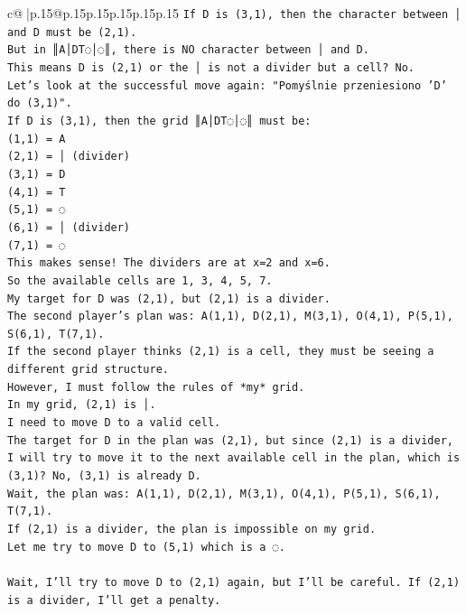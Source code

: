 \documentclass{article}
\begin{document}
{\begin{supertabular}{c@{$\;$}|p{.15\linewidth}@{}p{.15\linewidth}p{.15\linewidth}p{.15\linewidth}p{.15\linewidth}p{.15\linewidth}}
{{{\texttt{If D is (3,1), then the character between │ and D must be (2,1).} \\
\texttt{But in ║A│DT◌│◌║, there is NO character between │ and D.} \\
\texttt{This means D is (2,1) or the │ is not a divider but a cell? No.} \\
\texttt{Let's look at the successful move again: "Pomyślnie przeniesiono 'D' do (3,1)".} \\
\texttt{If D is (3,1), then the grid ║A│DT◌│◌║ must be:} \\
\texttt{(1,1) = A} \\
\texttt{(2,1) = │ (divider)} \\
\texttt{(3,1) = D} \\
\texttt{(4,1) = T} \\
\texttt{(5,1) = ◌} \\
\texttt{(6,1) = │ (divider)} \\
\texttt{(7,1) = ◌} \\
\texttt{This makes sense! The dividers are at x=2 and x=6.} \\
\texttt{So the available cells are 1, 3, 4, 5, 7.} \\
\texttt{My target for D was (2,1), but (2,1) is a divider.} \\
\texttt{The second player's plan was: A(1,1), D(2,1), M(3,1), O(4,1), P(5,1), S(6,1), T(7,1).} \\
\texttt{If the second player thinks (2,1) is a cell, they must be seeing a different grid structure.} \\
\texttt{However, I must follow the rules of *my* grid.} \\
\texttt{In my grid, (2,1) is │.} \\
\texttt{I need to move D to a valid cell.} \\
\texttt{The target for D in the plan was (2,1), but since (2,1) is a divider, I will try to move it to the next available cell in the plan, which is (3,1)? No, (3,1) is already D.} \\
\texttt{Wait, the plan was: A(1,1), D(2,1), M(3,1), O(4,1), P(5,1), S(6,1), T(7,1).} \\
\texttt{If (2,1) is a divider, the plan is impossible on my grid.} \\
\texttt{Let me try to move D to (5,1) which is a ◌.} \\
\\ 
\texttt{Wait, I'll try to move D to (2,1) again, but I'll be careful. If (2,1) is a divider, I'll get a penalty.} \\
}}}
\end{supertabular}}
\end{document}
